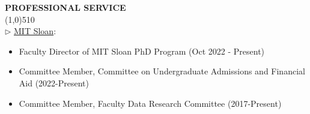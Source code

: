 \documentclass[11pt]{article}
\begin{document}
\vskip 0.5cm
\setlength{\parindent}{0in}
{\bf PROFESSIONAL SERVICE\\}
\vskip -0.85cm \line(1,0){510} \\ \vskip -0.15cm
$\triangleright$ \underline{MIT Sloan}:
\vspace*{-.07in}
\begin{itemize}
  \item Faculty Director of MIT Sloan PhD Program (Oct 2022 - Present)
\vspace*{-.07in}
    \item Committee Member, Committee on Undergraduate Admissions and Financial Aid (2022-Present)
\vspace*{-.07in}
		\item Committee Member, Faculty Data Research Committee (2017-Present)
	\end{itemize}

\end{document}
